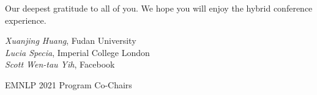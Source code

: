 Our deepest gratitude to all of you. We hope you will enjoy the hybrid conference experience.
\vspace{3em}

\noindent \textit{Xuanjing Huang}, Fudan University\\
\noindent \textit{Lucia Specia}, Imperial College London\\
\noindent \textit{Scott Wen-tau Yih}, Facebook

\noindent EMNLP 2021 Program Co-Chairs \\


